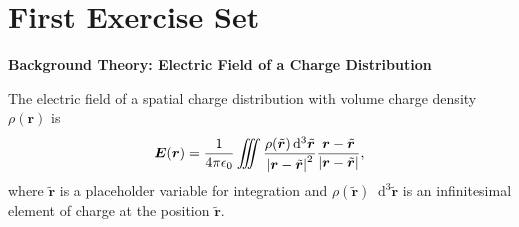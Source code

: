 \documentclass[11pt, a4paper]{article}
\newcommand{\diff}{\mathop{}\!\mathrm{d}} %
\renewcommand{\vec}[1]{\bm{#1}} %
\newcommand{\tvec}[1]{\tilde{\vec{#1}}} %
\renewcommand{\r}{\vec{r}}
\newcommand{\ee}{\epsilon_{0}}  %
\begin{document}
\newpage

\pagestyle{empty}  %
\tableofcontents

\newpage

\pagestyle{fancy}  %

\section{First Exercise Set}

\textbf{Background Theory: Electric Field of a Charge Distribution}
\vspace{2mm}

The electric field of a spatial charge distribution with volume charge density $ \rho(\r) $ is
\begin{equation*}
	\vec{E}(\vec{r}) = \frac{1}{4\pi \ee}\iiint \frac{\rho(\tvec{r}) \diff^{3}\tvec{r} }{\abs{\vec{r} - \tvec{r}}^{2}} \frac{\vec{r} - \tvec{r}}{\abs{\vec{r} - \tvec{r}}},
\end{equation*}
where $ \tvec{r} $ is a placeholder variable for integration and $ \rho(\tvec{r}) \diff^{3}\tvec{r} $ is an infinitesimal element of charge at the position $ \tvec{r} $.
\end{document}
